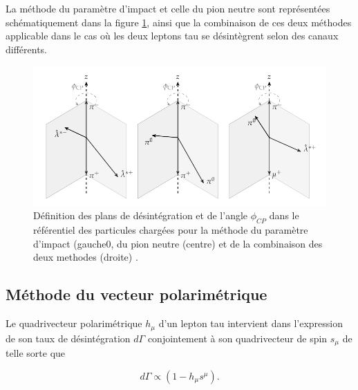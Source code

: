 La méthode du paramètre d'impact et celle du pion neutre sont représentées schématiquement dans la figure \ref{CPmethods}, ainsi que la combinaison de ces deux méthodes applicable dans le cas où les deux leptons tau se désintègrent selon des canaux différents.


\begin{figure}
\centering
    \includegraphics[scale=0.9]{Chapitre6/Images/Figure_002.pdf} 
    \caption{Définition des plans de désintégration et de l'angle $\phi_{CP}$ dans le référentiel des particules chargées pour la méthode du paramètre d'impact (gauche0, du pion neutre (centre) et de la combinaison des deux methodes (droite) \cite{Htautau}.}
    \label{CPmethods}
\end{figure}

\subsection{Méthode du vecteur polarimétrique}

Le quadrivecteur polarimétrique $h_{\mu}$ d'un lepton tau intervient dans l'expression de son taux de désintégration $d\Gamma$ conjointement à son quadrivecteur de spin $s_{\mu}$ de telle sorte que 

\begin{equation}
    d\Gamma\propto(1-h_{\mu}s^{\mu}).
    \label{dGamma}
\end{equation}

